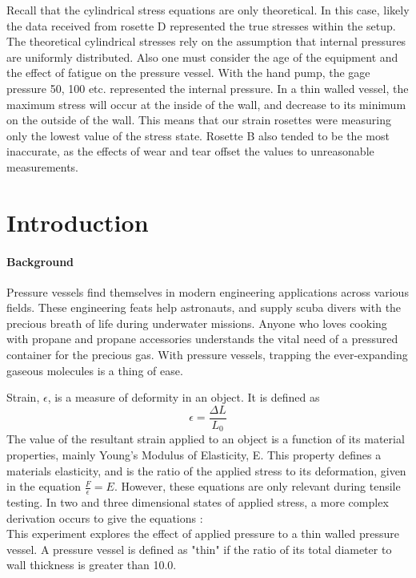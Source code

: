 \documentclass{article}
\begin{document}
Recall that the cylindrical stress equations are only theoretical. In this case, likely the data received
from rosette D represented the true stresses within the setup. The theoretical cylindrical stresses rely
on the assumption that internal pressures are uniformly distributed. Also one must consider
the age of the equipment and the effect of fatigue on the pressure vessel. With the hand pump, the
gage pressure 50, 100 etc. represented the internal pressure. In a thin walled vessel, the maximum stress
will occur at the inside of the wall, and decrease to its minimum on the outside of the wall. This means
that our strain rosettes were measuring only the lowest value of the stress state. Rosette B also tended
to be the most inaccurate, as the effects of wear and tear offset the values to unreasonable measurements. 


\newpage 




\section{Introduction}

\paragraph{Background} 
Pressure vessels find themselves in modern engineering applications across various fields. These 
engineering feats help astronauts, and supply scuba divers with the precious breath of life during
underwater missions. Anyone who loves cooking with propane and propane accessories understands the 
vital need of a pressured container for the precious gas. With pressure vessels, trapping the ever-expanding
gaseous molecules is a thing of ease. 

	Strain, $\epsilon$, is a measure of deformity in an object. It is defined as 
$$ \epsilon = \frac {\Delta L}{L_0}$$
The value of the resultant strain applied to an object is a function of its material properties, mainly
Young's Modulus of Elasticity, E. This property defines a materials elasticity, and is the ratio of the 
applied stress to its deformation, given in the equation $ \frac{F}{\epsilon} = E  $. However, these equations
are only relevant during tensile testing. In two and three dimensional states of applied stress, a more 
complex derivation occurs to give the equations :  \\
This experiment explores the effect of applied pressure to a thin walled pressure vessel. A pressure 
vessel is defined as "thin" if the ratio of its total diameter to wall thickness is greater than 10.0. 
\end{document}
